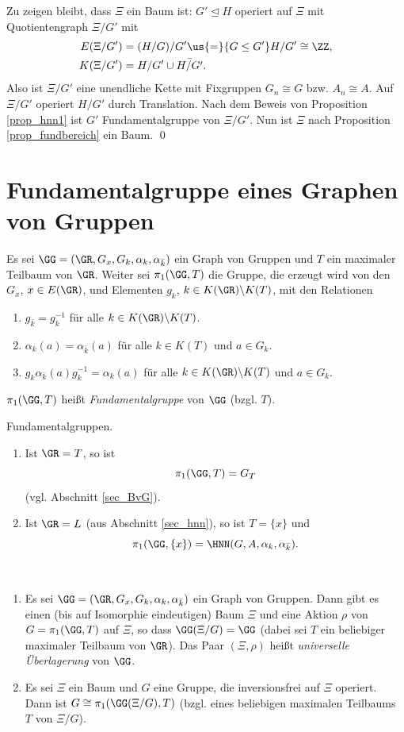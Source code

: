 Zu zeigen bleibt, dass $\Xi$ ein Baum ist: $G' \unlhd H$ operiert auf
$\Xi$ mit Quotientengraph $\Xi/G'$ mit
\begin{align*}
E(\Xi/G') &= (H/G)/G' \us{=}{G\leq G'} H/G' \cong \ZZ, \\
K(\Xi/G') &= H/G' \cup \bar{H/G'}.
\end{align*}
Also ist $\Xi/G'$ eine unendliche Kette mit Fixgruppen
$G_n\cong G$ bzw. $A_n\cong A$.
Auf $\Xi/G'$ operiert $H/G'$ durch Translation.
Nach dem Beweis von Proposition \ref{prop_hnn1} ist $G'$
Fundamentalgruppe von $\Xi/G'$.
Nun ist $\Xi$ nach Proposition \ref{prop_fundbereich} ein Baum.
\qed


\section{Fundamentalgruppe eines Graphen von Gruppen}\label{sec_FG_GvG}

\DB\label{def_FG2}
Es sei $\GG=(\GR,G_x,G_k,\alpha_k,\alpha_{\bar{k}})$ ein Graph
von Gruppen und $T$ ein maximaler Teilbaum von $\GR$.
Weiter sei $\pi_1(\GG,T)$ die Gruppe, die erzeugt wird
von den $G_x$, $x\in E(\GR)$, und Elementen $g_k$, $k\in K(\GR)\backslash K(T)$,
mit den Relationen
\begin{enumerate}
\item $g_{\bar{k}}=g_k^{-1}$ für alle $k\in K(\GR)\backslash K(T)$.
\item $\alpha_k(a)=\alpha_{\bar{k}}(a)$ für alle $k\in K(T)$ und
$a\in G_k$.
\item $g_k \alpha_{\bar{k}}(a) g_k^{-1} = \alpha_k(a)$
für alle $k\in K(\GR)\backslash K(T)$ und $a\in G_k$.
\end{enumerate}
$\pi_1(\GG,T)$ heißt \emph{Fundamentalgruppe}
von $\GG$ (bzgl. $T$).

\BSP Fundamentalgruppen.
\begin{enumerate}
\item Ist $\GR=T$, so ist 
\[
\pi_1(\GG,T)=G_T
\]
(vgl. Abschnitt \ref{sec_BvG}).
\item Ist $\GR=L$ (aus Abschnitt \ref{sec_hnn}), so ist $T=\{x\}$ und
\[
\pi_1(\GG,\{x\})=\HNN(G,A,\alpha_k,\alpha_{\bar{k}}).
\]
\end{enumerate}

\SATZ \label{satz_cover}\
\begin{enumerate}
\item Es sei $\GG=(\GR,G_x,G_k,\alpha_k,\alpha_{\bar{k}})$ ein
Graph von Gruppen.
Dann gibt es einen (bis auf Isomorphie eindeutigen) Baum $\Xi$
und eine Aktion $\rho$ von $G=\pi_1(\GG,T)$ auf $\Xi$, so dass
$\GG(\Xi/G)=\GG$ (dabei sei $T$ ein beliebiger maximaler Teilbaum
von $\GR$). Das Paar $(\Xi,\rho)$ heißt
\emph{universelle Überlagerung}
von $\GG$.
\item Es sei $\Xi$ ein Baum und $G$ eine Gruppe, die inversionsfrei
auf $\Xi$ operiert. Dann ist $G\cong \pi_1(\GG(\Xi/G),T)$
(bzgl. eines beliebigen maximalen Teilbaums $T$ von $\Xi/G$).
\end{enumerate}

